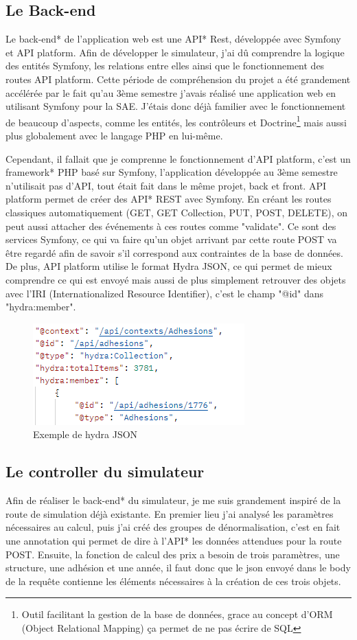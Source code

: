 \documentclass[a4paper,12pt]{report}
\begin{document}
\subsection{Le Back-end}
Le back-end* de l'application web est une API* Rest, développée avec Symfony et API platform. Afin de développer le simulateur, j'ai dû comprendre la logique des entités Symfony, les relations entre elles ainsi que le fonctionnement des routes API platform. Cette période de compréhension du projet a été grandement accélérée par le fait qu'au 3ème semestre j'avais réalisé une application web en utilisant Symfony pour la SAE. J'étais donc déjà familier avec le fonctionnement de beaucoup d'aspects, comme les entités, les contrôleurs et Doctrine\footnote{Outil facilitant la gestion de la base de données, grace au concept d'ORM (Object Relational Mapping) ça permet de ne pas écrire de SQL} mais aussi plus globalement avec le langage PHP en lui-même.

Cependant, il fallait que je comprenne le fonctionnement d'API platform, c'est un framework* PHP basé sur Symfony, l'application développée au 3ème semestre n'utilisait pas d'API, tout était fait dans le même projet, back et front. API platform permet de créer des API* REST avec Symfony. En créant les routes classiques automatiquement (GET, GET Collection, PUT, POST, DELETE), on peut aussi attacher des événements à ces routes comme "validate". Ce sont des services Symfony, ce qui va faire qu'un objet arrivant par cette route POST va être regardé afin de savoir s'il correspond aux contraintes de la base de données. De plus, API platform utilise le format Hydra JSON, ce qui permet de mieux comprendre ce qui est envoyé mais aussi de plus simplement retrouver des objets avec l'IRI (Internationalized Resource Identifier), c'est le champ "@id" dans "hydra:member".

\begin{figure}[ht]
    \centering
    \includegraphics[scale=0.8]{hydraJSON.png}
    \caption{Exemple de hydra JSON}
    \label{fig:hyda-json}
\end{figure}

\subsection{Le controller du simulateur}
Afin de réaliser le back-end* du simulateur, je me suis grandement inspiré de la route de simulation déjà existante. En premier lieu j'ai analysé les paramètres nécessaires au calcul, puis j'ai créé des groupes de dénormalisation, c'est en fait une annotation qui permet de dire à l'API* les données attendues pour la route POST. Ensuite, la fonction de calcul des prix a besoin de trois paramètres, une structure, une adhésion et une année, il faut donc que le json envoyé dans le body de la requête contienne les éléments nécessaires à la création de ces trois objets.
\end{document}

